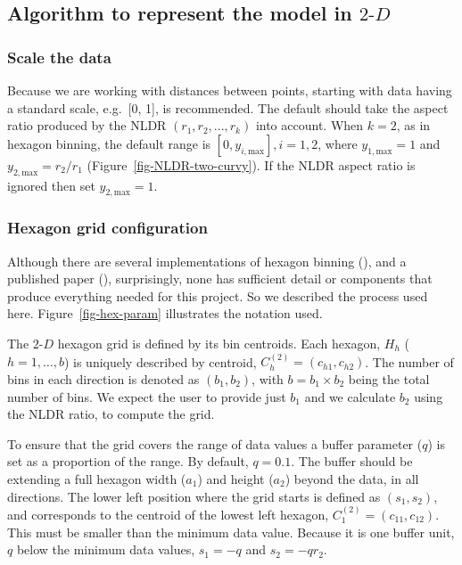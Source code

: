 \documentclass[
  11pt,
  a4paper,
]{report}
\newcommand\gD{$2\text{-}D$}
\begin{document}
\subsection{\texorpdfstring{Algorithm to represent the model in
\gD{}}{Algorithm to represent the model in }}\label{algorithm-to-represent-the-model-in}

\subsubsection{Scale the data}\label{scale-the-data}

Because we are working with distances between points, starting with data
having a standard scale, e.g.~{[}0, 1{]}, is recommended. The default
should take the aspect ratio produced by the NLDR
\((r_1, r_2, ..., r_k)\) into account. When \(k=2\), as in hexagon
binning, the default range is \([0, y_{i,\text{max}}], i=1,2\), where
\(y_{1,\text{max}}=1\) and \(y_{2,\text{max}} = r_2/r_1\)
(Figure~\ref{fig-NLDR-two-curvy}). If the NLDR aspect ratio is ignored
then set \(y_ {2,\text{max}} = 1.\)

\subsubsection{Hexagon grid
configuration}\label{hexagon-grid-configuration}

Although there are several implementations of hexagon binning
(), and a published paper
(), surprisingly, none has
sufficient detail or components that produce everything needed for this
project. So we described the process used here.
Figure~\ref{fig-hex-param} illustrates the notation used.

The \gD{} hexagon grid is defined by its bin centroids. Each hexagon,
\(H_h\) (\(h = 1, \dots, b\)) is uniquely described by centroid,
\(C_{h}^{(2)} = (c_{h1}, c_{h2})\). The number of bins in each direction
is denoted as \((b_1, b_2)\), with \(b = b_1 \times b_2\) being the
total number of bins. We expect the user to provide just \(b_1\) and we
calculate \(b_2\) using the NLDR ratio, to compute the grid.

To ensure that the grid covers the range of data values a buffer
parameter (\(q\)) is set as a proportion of the range. By default,
\(q=0.1\). The buffer should be extending a full hexagon width (\(a_1\))
and height (\(a_2\)) beyond the data, in all directions. The lower left
position where the grid starts is defined as \((s_1, s_2)\), and
corresponds to the centroid of the lowest left hexagon,
\(C_{1}^{(2)} = (c_{11}, c_{12})\). This must be smaller than the
minimum data value. Because it is one buffer unit, \(q\) below the
minimum data values, \(s_1 = -q\) and \(s_2 = -qr_2\).
\end{document}
